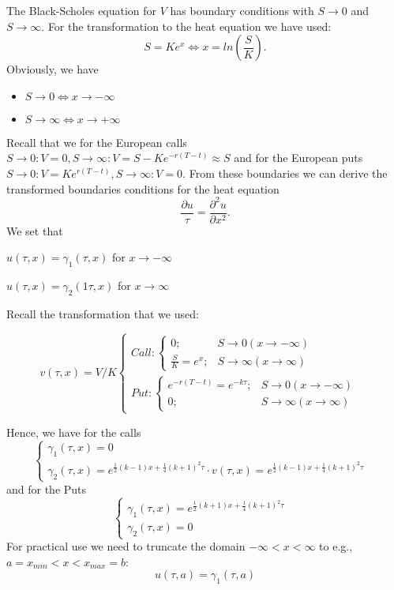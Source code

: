 \documentclass{article}
\begin{document}
The Black-Scholes equation for $V$ has boundary conditions with $S\rightarrow 0$ and $ S \rightarrow \infty $. For the transformation to the heat equation we have used:
$$
S = Ke^x \Leftrightarrow x = ln(\frac{S}{K}).
$$ 
Obviously, we have
\begin{itemize}
\item$S \rightarrow 0 \Leftrightarrow x \rightarrow -\infty$
\item$S \rightarrow \infty \Leftrightarrow x \rightarrow +\infty$
\end{itemize}
Recall that we for the European calls $S \rightarrow 0 : V = 0, S \rightarrow \infty : V = S - Ke^{-r(T - t)} \approx S$ and for the European puts $S \rightarrow 0 : V = Ke^{r(T-t)}, S \rightarrow \infty : V = 0$. From these boundaries we can derive the transformed boundaries conditions for the heat equation
$$
\frac{\partial u}{\tau} = \frac{\partial^2 u}{\partial x^2}.
$$
We set that
\begin{center}
$
u(\tau, x) = \gamma_1(\tau,x) $ for $x\rightarrow -\infty
$
\end{center}
\begin{center}
$
u(\tau, x) = \gamma_2(1\tau,x)$ for $x \rightarrow \infty
$
\end{center}

Recall the transformation that we used:

$$
v(\tau,x) = V/K\begin{cases}
Call:\begin{cases}
0; &  S \rightarrow 0 (x \rightarrow -\infty) \\ 
 \frac{S}{K} = e^x;& S \rightarrow \infty (x \rightarrow \infty)
\end{cases} &  \\ 
 Put:\begin{cases}
e^{-r(T-t)} = e^{-k\tau}; & S \rightarrow 0 (x \rightarrow -\infty)\\ 
0; & S \rightarrow \infty(x \rightarrow \infty)
\end{cases}& 
\end{cases}
$$

Hence, we have for the calls
$$
\begin{cases}
 \gamma_1(\tau, x) =  0& \\ 
 \gamma_2(\tau, x) = e^{\frac{1}{2}(k-1)x + \frac{1}{4}(k+1)^2\tau}\cdot v(\tau, x) = e^{\frac{1}{2}(k-1)x + \frac{1}{4}(k+1)^2\tau}& 
\end{cases}
$$
and for the Puts
$$
\begin{cases}
 \gamma_1(\tau, x) = e^{\frac{1}{2}(k+1)x+\frac{1}{4}(k+1)^2\tau}&  \\ 
 \gamma_2(\tau, x) = 0& 
\end{cases}
$$
For practical use we need to truncate the domain $-\infty < x < \infty $ to e.g.,$a = x_{min} < x < x_{max} = b$:
$$
u(\tau, a) = \gamma_1(\tau, a)
$$
\end{document}
